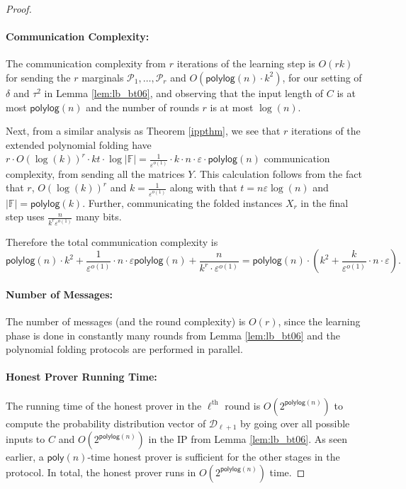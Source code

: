 \documentclass[10pt,a4paper]{article}
\newcommand{\poly}{\mathsf{poly}}
\newcommand{\polylog}{\mathsf{polylog}}
\newcommand{\F}{\mathbb{F}}
\newcommand{\sD}{\mathcal{D}}
\newcommand{\sP}{\mathcal{P}}
\begin{document}
\begin{proof}
\paragraph*{Communication Complexity:}
The communication complexity from $r$ iterations of the learning step is $O(rk)$ for sending the $r$ marginals $\sP_1, \dots, \sP_r$ and $O(\polylog (n)\cdot k^{2})$, for our setting of $\delta$ and $\tau^{2}$ in Lemma \ref{lem:lb_bt06}, and observing that the input length of $C$ is at most $\polylog(n)$ and the number of rounds $r$ is at most $\log (n)$. 

Next, from a similar analysis as Theorem \ref{ippthm}, we see that $r$ iterations of the extended polynomial folding have $r\cdot O(\log (k))^{r}\cdot kt\cdot \log\vert \F \vert=\frac{1}{\varepsilon^{o(1)}}\cdot k\cdot n\cdot \varepsilon\cdot \polylog(n)$ communication complexity, from sending all the matrices $Y$. This calculation follows from the fact that $r$, $O(\log (k))^{r}$ and $k=\frac{1}{\varepsilon^{o(1)}}$ along with that $t=n\varepsilon\log (n)$ and $|\F|=\polylog(k)$. Further, communicating the folded instances $X_r$ in the final step uses $\frac{n}{k^{r}\varepsilon^{o(1)}}$ many bits. 


Therefore the total communication complexity is
\begin{equation*}
    \polylog(n)\cdot k^{2}+\frac{1}{\varepsilon^{o(1)}}\cdot n\cdot \varepsilon\polylog(n) + \frac{n}{k^{r}\cdot \varepsilon^{o(1)}}=\polylog (n) \cdot \left(k^{2}+\frac{k}{\varepsilon^{o(1)}}\cdot n\cdot\varepsilon\right).
\end{equation*}

\paragraph*{Number of Messages:} The number of messages (and the round complexity) is $O(r)$, since the learning phase is done in constantly many rounds from Lemma \ref{lem:lb_bt06} and the polynomial folding protocols are performed in parallel.

\paragraph*{Honest Prover Running Time:} 
The running time of the honest prover in the $\ell^{\text{th}}$ round is $O \left( 2^{\polylog(n)} \right)$ to compute the probability distribution vector of $\sD_{\ell+1}$ by going over all possible inputs to $C$ and $O \left( 2^{\polylog(n)} \right)$ in the IP from Lemma \ref{lem:lb_bt06}. As seen earlier, a $\poly(n)$-time honest prover is sufficient for the other stages in the protocol. In total, the honest prover runs in $O \left( 2^{\polylog(n)} \right)$ time.


\end{proof}
\end{document}
